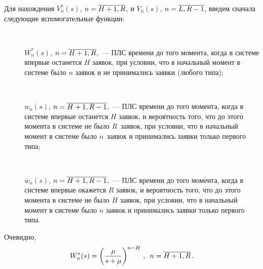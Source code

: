 \begin{multicols}{2}
Для нахождения $V^*_n(s)$, $n\hm=\overline{H+1,R}$, и $V_n(s)$,
$n\hm=\overline{L,R-1}$, введем сначала следующие вспомогательные функции:
\begin{description}
\item[\,] $W^*_n(s)$, $n\hm=\overline{H+1,R}$,~--- ПЛС времени до того
момента, когда в системе впервые останется $H$ заявок, при условии,
что в начальный момент в системе было $n$ заявок и не принимались
заявки (любого типа);
\item[\,]
$w_n(s)$, $n\hm=\overline{H+1,R-1}$,~--- ПЛС времени до того
момента, когда в системе впервые останется $H$ заявок, и вероятность
того, что до этого момента в системе не было $R$~заявок, при
условии, что в начальный момент в системе было $n$~заявок и
принимались заявки только первого типа;
\item[\,]
$\overline{w}_n(s)$, $n\hm=\overline{H+1,R-1}$,~--- ПЛС времени до того
момента, когда в системе впервые окажется $R$ заявок, и вероятность
того, что до этого момента в системе не было $H$ заявок, при
условии, что в начальный момент в системе было $n$ заявок и
принимались заявки только первого типа.
\end{description}

Очевидно,
\begin{equation*}
W^*_n(s) = \left(\displaystyle\frac{\displaystyle \mu\mathstrut}{\displaystyle s + \mu\mathstrut}\right)^{n-H} \,,\enskip  n=\overline{H+1,R}\,.
\end{equation*}


\end{multicols}
